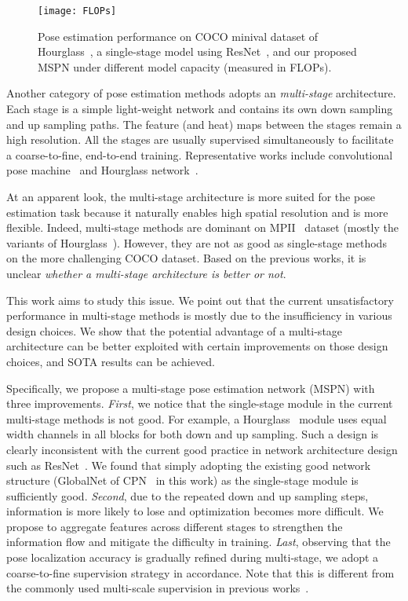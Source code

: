\documentclass[10pt,twocolumn,letterpaper]{article}
\begin{document}
\begin{figure}
	\begin{center}
		\texttt{[image: FLOPs]}
	\end{center}
	\caption{Pose estimation performance on COCO minival dataset of Hourglass~\cite{newell2016stacked}, a single-stage model using ResNet~\cite{he2016deep}, and our proposed MSPN under different model capacity (measured in FLOPs).}
	\label{fig:FLOPs}
\end{figure}

Another category of pose estimation methods adopts an \emph{multi-stage} architecture. Each stage is a simple light-weight network and contains its own down sampling and up sampling paths. The feature (and heat) maps between the stages remain a high resolution. All the stages are usually supervised simultaneously to facilitate a coarse-to-fine, end-to-end training. Representative works include convolutional pose machine~\cite{wei2016convolutional} and Hourglass network~\cite{newell2016stacked}.

At an apparent look, the multi-stage architecture is more suited for the pose estimation task because it naturally enables high spatial resolution and is more flexible. Indeed, multi-stage methods are dominant on MPII~\cite{andriluka20142d} dataset (mostly the variants of Hourglass~\cite{newell2016stacked}). However, they are not as good as single-stage methods on the more challenging COCO dataset. Based on the previous works, it is unclear \emph{whether a multi-stage architecture is better or not}.

This work aims to study this issue. We point out that the current unsatisfactory performance in multi-stage methods is mostly due to the insufficiency in various design choices. We show that the potential advantage of a multi-stage architecture can be better exploited with certain improvements on those design choices, and SOTA results can be achieved. 

Specifically, we propose a multi-stage pose estimation network (MSPN) with three improvements. \emph{First}, we notice that the single-stage module in the current multi-stage methods is not good. For example, a Hourglass~\cite{newell2016stacked} module uses equal width channels in all blocks for both down and up sampling. Such a design is clearly inconsistent with the current good practice in network architecture design such as ResNet~\cite{he2016deep}. We found that simply adopting the existing good network structure (GlobalNet of CPN~\cite{chen2018cascaded} in this work) as the single-stage module is sufficiently good. \emph{Second}, due to the repeated down and up sampling steps, information is more likely to lose and optimization becomes more difficult. We propose to aggregate features across different stages to strengthen the information flow and mitigate the difficulty in training. \emph{Last}, observing that the pose localization accuracy is gradually refined during multi-stage, we adopt a coarse-to-fine supervision strategy in accordance. Note that this is different from the commonly used multi-scale supervision in previous works~\cite{newell2016stacked, newell2017associative, yang2017learning, ke2018multi}.
\end{document}

